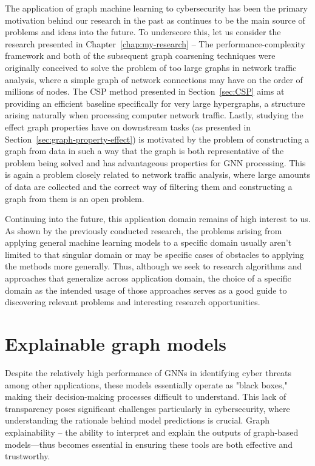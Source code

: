 The application of graph machine learning to cybersecurity has been the primary motivation behind our research in the past as continues to be the main source of problems and ideas into the future. To underscore this, let us consider the research presented in Chapter~\ref{chap:my-research} -- The performance-complexity framework and both of the subsequent graph coarsening techniques were originally conceived to solve the problem of too large graphs in network traffic analysis, where a simple graph of network connections may have on the order of millions of nodes. The CSP method presented in Section~\ref{sec:CSP} aims at providing an efficient baseline specifically for very large hypergraphs, a structure arising naturally when processing computer network traffic. Lastly, studying the effect graph properties have on downstream tasks (as presented in Section~\ref{sec:graph-property-effect}) is motivated by the problem of constructing a graph from data in such a way that the graph is both representative of the problem being solved and has advantageous properties for GNN processing. This is again a problem closely related to network traffic analysis, where large amounts of data are collected and the correct way of filtering them and constructing a graph from them is an open problem.

Continuing into the future, this application domain remains of high interest to us. As shown by the previously conducted research, the problems arising from applying general machine learning models to a specific domain usually aren't limited to that singular domain or may be specific cases of obstacles to applying the methods more generally. Thus, although we seek to research algorithms and approaches that generalize across application domain, the choice of a specific domain as the intended usage of those approaches serves as a good guide to discovering relevant problems and interesting research opportunities.

\section{Explainable graph models}
\label{sec:graph-explainability}

Despite the relatively high performance of GNNs in identifying cyber threats among other applications, these models essentially operate as "black boxes," making their decision-making processes difficult to understand. This lack of transparency poses significant challenges particularly in cybersecurity, where understanding the rationale behind model predictions is crucial. Graph explainability -- the ability to interpret and explain the outputs of graph-based models—thus becomes essential in ensuring these tools are both effective and trustworthy.

